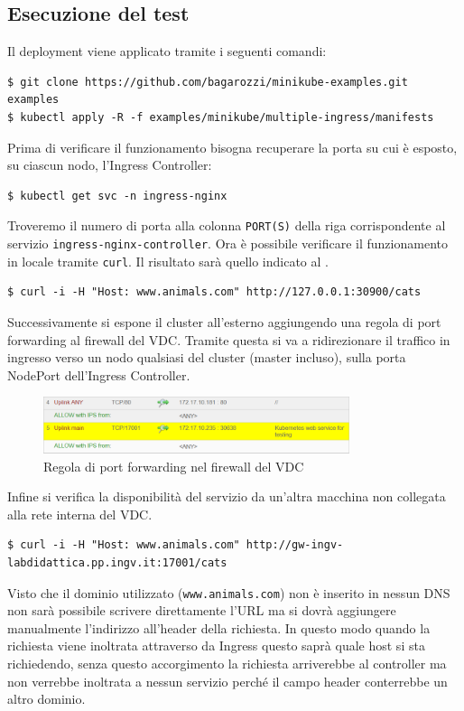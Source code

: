 \documentclass[12pt,a4paper,openright,twoside]{book}
\begin{document}
\subsection{Esecuzione del test}
Il deployment viene applicato tramite i seguenti comandi:
\begin{lstlisting}
$ git clone https://github.com/bagarozzi/minikube-examples.git examples
$ kubectl apply -R -f examples/minikube/multiple-ingress/manifests
\end{lstlisting}
Prima di verificare il funzionamento bisogna recuperare la porta su cui è esposto, su ciascun nodo, l'Ingress Controller:
\begin{lstlisting}
$ kubectl get svc -n ingress-nginx                
\end{lstlisting}
Troveremo il numero di porta alla colonna \texttt{PORT(S)} della riga corrispondente al servizio \texttt{ingress-nginx-controller}.
Ora è possibile verificare il funzionamento in locale tramite \texttt{curl}. Il risultato sarà quello indicato al .
\begin{lstlisting}
$ curl -i -H "Host: www.animals.com" http://127.0.0.1:30900/cats
\end{lstlisting}
Successivamente si espone il cluster all'esterno aggiungendo una regola di port forwarding al firewall del VDC. Tramite questa si va a ridirezionare il traffico in ingresso verso
un nodo qualsiasi del cluster (master incluso), sulla porta NodePort dell'Ingress Controller.
\begin{figure}[!hbt]
    \centering
    \includegraphics[width=0.8\textwidth]{figures/forwarding-rule.png}
    \caption{Regola di port forwarding nel firewall del VDC}
    \label{fig:firewall-rule}
\end{figure}
Infine si verifica la disponibilità del servizio da un'altra macchina non collegata alla rete interna del VDC. 
\begin{lstlisting}
$ curl -i -H "Host: www.animals.com" http://gw-ingv-labdidattica.pp.ingv.it:17001/cats
\end{lstlisting}
Visto che il dominio utilizzato (\texttt{www.animals.com}) non è inserito in nessun DNS non sarà possibile scrivere direttamente l'URL ma si dovrà aggiungere manualmente
l'indirizzo all'header della richiesta. In questo modo quando la richiesta viene inoltrata attraverso da Ingress questo saprà quale host si sta richiedendo,
senza questo accorgimento la richiesta arriverebbe al controller ma non verrebbe inoltrata a nessun servizio perché il campo header conterrebbe un altro dominio. 

\end{document}

